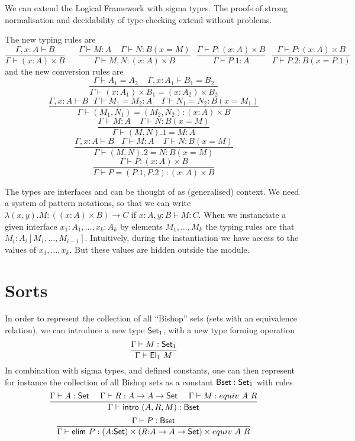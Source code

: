 \documentclass[11pt]{article}
\def\SET{\hbox{\sf Set}}
\def\BSET{\hbox{\sf Bset}}
\def\EL{\hbox{\sf El}}
\def\INTRO{\hbox{\sf intro}}
\def\ELIM{\hbox{\sf elim}}
\begin{document}
 We can extend the Logical Framework with sigma types. The proofs of strong normalisation
and decidability of type-checking extend without problems. 

 The new typing rules are
$$
\frac{\Gamma,x{:}A\vdash B}{\Gamma\vdash (x{:}A)\times B}~~~~~~~
\frac{\Gamma\vdash M:A~~~~~\Gamma\vdash N:B(x=M)}{\Gamma\vdash M,N:(x{:}A)\times B}~~~
\frac{\Gamma\vdash P:(x{:}A)\times B}{\Gamma\vdash P.1:A}~~~
\frac{\Gamma\vdash P:(x{:}A)\times B}{\Gamma\vdash P.2:B(x=P.1)}
$$
and the new conversion rules are
$$
\frac{\Gamma\vdash A_1=A_2~~~~~\Gamma,x{:}A_1\vdash B_1=B_2}
     {\Gamma\vdash (x{:}A_1)\times B_1 = (x{:}A_2)\times B_2}
$$
$$
\frac{\Gamma,x:A\vdash B~~~\Gamma\vdash M_1=M_2:A~~~~~\Gamma\vdash N_1=N_2:B(x=M_1)}
     {\Gamma\vdash (M_1,N_1) = (M_2,N_2):(x:A)\times B}$$
$$
\frac{\Gamma\vdash M:A~~~~~\Gamma\vdash N:B(x=M)}
     {\Gamma\vdash (M,N).1 = M:A}$$
$$
\frac{\Gamma,x:A\vdash B~~~~\Gamma\vdash M:A~~~~~\Gamma\vdash N:B(x=M)}
     {\Gamma\vdash (M,N).2 = N:B(x=M)}$$
$$
\frac{\Gamma\vdash P:(x{:}A)\times B}{\Gamma\vdash P = (P.1,P.2):(x{:}A)\times B}
$$

 The types are interfaces and can be thought of as (generalised) context. We need a system
of pattern notations, so that we can write
$\lambda (x,y).M:((x:A)\times B)\rightarrow C$ if $x{:}A,y{:}B\vdash M:C$.
When we instanciate a given interface $x_1{:}A_1,\dots,x_k{:}A_k$ by elements
$M_1,\dots,M_k$ the typing rules are that $M_i:A_i[M_1,\dots,M_{i-1}]$. Intuitively,
during the instantiation we have access to the values of $x_1,\dots,x_k$. But
these values are hidden outside the module.

\section{Sorts}

 In order to represent the collection of all ``Bishop'' sets (sets with an equivalence
relation), we can introduce a new type $\SET_1$, with a new type forming operation
$$\frac{\Gamma\vdash M:\SET_1}{\Gamma\vdash \EL_1~M}$$
In combination with sigma types, and defined constants, one can then represent
for instance the collection of all Bishop sets as a constant
$\BSET:\SET_1$ with rules
$$
\frac{\Gamma\vdash A:\SET~~~~\Gamma\vdash R:A\rightarrow A\rightarrow\SET~~~~
      \Gamma\vdash M:equiv~A~R}
     {\Gamma\vdash \INTRO~(A,R,M):\BSET}
$$
$$
\frac{\Gamma\vdash P:\BSET}
     {\Gamma\vdash \ELIM~P:(A{:}\SET)\times (R{:}A\rightarrow A\rightarrow\SET)\times equiv~A~R}
$$
\end{document}
